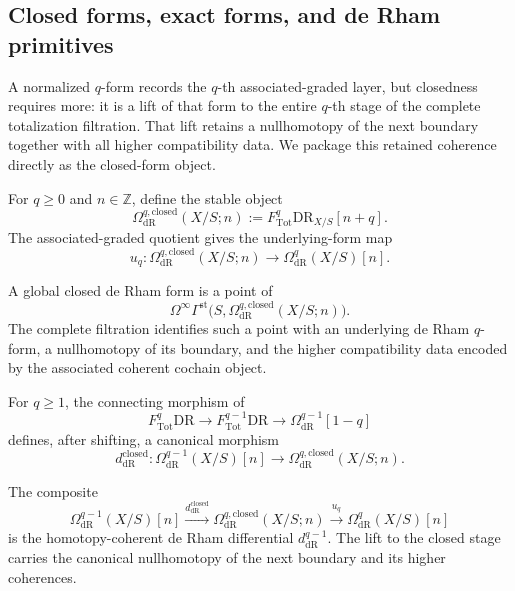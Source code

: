 \subsection{Closed forms, exact forms, and de Rham primitives}
\label{sec:closed-forms}

A normalized \(q\)-form records the \(q\)-th associated-graded layer, but
closedness requires more: it is a lift of that form to the entire \(q\)-th
stage of the complete totalization filtration. That lift retains a
nullhomotopy of the next boundary together with all higher compatibility
data. We package this retained coherence directly as the closed-form
object.

\begin{definition}
For \(q\geq0\) and \(n\in\mathbb Z\), define the stable object
\[
  \Omega^{q,\mathrm{closed}}_{\mathrm{dR}}(X/S;n)
  :=
  F^q_{\mathrm{Tot}}\mathrm{DR}_{X/S}[n+q].
\]
The associated-graded quotient gives the underlying-form map
\[
  u_q:
  \Omega^{q,\mathrm{closed}}_{\mathrm{dR}}(X/S;n)
  \longrightarrow
  \Omega^q_{\mathrm{dR}}(X/S)[n].
\]
\end{definition}

\begin{remark}
A global closed de Rham form is a point of
\[
  \Omega^\infty
  \Gamma^{\mathrm{st}}
  \bigl(S,\Omega^{q,\mathrm{closed}}_{\mathrm{dR}}(X/S;n)\bigr).
\]
The complete filtration identifies such a point with an underlying de Rham
\(q\)-form, a nullhomotopy of its boundary, and the higher compatibility data
encoded by the associated coherent cochain object.
\end{remark}

\begin{definition}
For \(q\geq1\), the connecting morphism of
\[
  F^q_{\mathrm{Tot}}\mathrm{DR}
  \longrightarrow
  F^{q-1}_{\mathrm{Tot}}\mathrm{DR}
  \longrightarrow
  \Omega^{q-1}_{\mathrm{dR}}[1-q]
\]
defines, after shifting, a canonical morphism
\[
  d^{\mathrm{closed}}_{\mathrm{dR}}:
  \Omega^{q-1}_{\mathrm{dR}}(X/S)[n]
  \longrightarrow
  \Omega^{q,\mathrm{closed}}_{\mathrm{dR}}(X/S;n).
\]
\end{definition}

\begin{proposition}
\label{prop:exact-classifier-boundary}
The composite
\[
  \Omega^{q-1}_{\mathrm{dR}}(X/S)[n]
  \xrightarrow{d^{\mathrm{closed}}_{\mathrm{dR}}}
  \Omega^{q,\mathrm{closed}}_{\mathrm{dR}}(X/S;n)
  \xrightarrow{u_q}
  \Omega^q_{\mathrm{dR}}(X/S)[n]
\]
is the homotopy-coherent de Rham differential \(d^{q-1}_{\mathrm{dR}}\). The lift to the
closed stage carries the canonical nullhomotopy of the next boundary and its higher
coherences.
\end{proposition}

